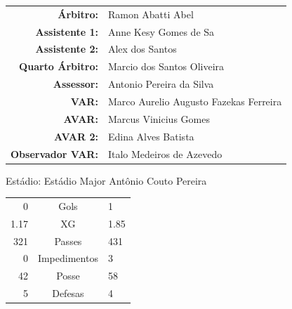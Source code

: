 \documentclass[11pt]{article}
\newcommand{\teamjersey}{}
\begin{document}
\vspace{0.5cm}
\begin{minipage}{0.65\textwidth}
\begin{center}
\begin{tabular}{rl}
\textbf{Árbitro:} & Ramon Abatti Abel \\
\textbf{Assistente 1:} & Anne Kesy Gomes de Sa \\
\textbf{Assistente 2:} & Alex dos Santos \\
\textbf{Quarto Árbitro:} & Marcio dos Santos Oliveira \\
\textbf{Assessor:} & Antonio Pereira da Silva \\
\textbf{VAR:} & Marco Aurelio Augusto Fazekas Ferreira \\
\textbf{AVAR:} & Marcus Vinicius Gomes \\
\textbf{AVAR 2:} & Edina Alves Batista \\
\textbf{Observador VAR:} & Italo Medeiros de Azevedo \\
\end{tabular}
\end{center}
\end{minipage}
\begin{minipage}{0.3\textwidth}
Estádio: Estádio Major Antônio Couto Pereira\\
\begin{tabular}{rcl}
0 & Gols & 1 \\
1.17 & XG & 1.85 \\
321 & Passes & 431 \\
0 & Impedimentos & 3 \\
42 & Posse & 58 \\
5 & Defesas & 4 \\
\end{tabular}
\end{minipage}
\newpage
\vspace{0.5cm}
\renewcommand{\teamjersey}{../assets/camisa/costas1.png}
\end{document}
